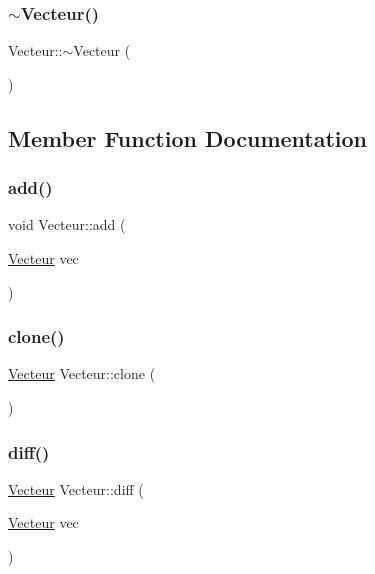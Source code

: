 \mbox{\label{classVecteur_a60c65b39413a03afd489d547d2bbe023}} 
\subsubsection{\texorpdfstring{$\sim$\+Vecteur()}{~Vecteur()}}
{\footnotesize\ttfamily Vecteur\+::$\sim$\+Vecteur (\begin{DoxyParamCaption}{ }\end{DoxyParamCaption})\hspace{0.3cm}{\ttfamily [virtual]}}



\subsection{Member Function Documentation}
\mbox{\label{classVecteur_a10692812b76b66152d4c4bfcba2c449d}} 
\subsubsection{\texorpdfstring{add()}{add()}}
{\footnotesize\ttfamily void Vecteur\+::add (\begin{DoxyParamCaption}\item[{\mbox{\hyperlink{classVecteur}{Vecteur}}}]{vec }\end{DoxyParamCaption})}

\mbox{\label{classVecteur_a5594a323b7dbb6a0ac502961a915c2ec}} 
\subsubsection{\texorpdfstring{clone()}{clone()}}
{\footnotesize\ttfamily \mbox{\hyperlink{classVecteur}{Vecteur}} Vecteur\+::clone (\begin{DoxyParamCaption}{ }\end{DoxyParamCaption})}

\mbox{\label{classVecteur_af37d9e2e371346a60218c78a234285d3}} 
\subsubsection{\texorpdfstring{diff()}{diff()}}
{\footnotesize\ttfamily \mbox{\hyperlink{classVecteur}{Vecteur}} Vecteur\+::diff (\begin{DoxyParamCaption}\item[{\mbox{\hyperlink{classVecteur}{Vecteur}}}]{vec }\end{DoxyParamCaption})}


